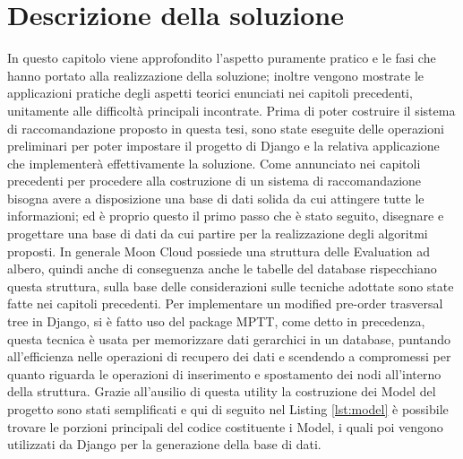 \chapter{Descrizione della soluzione}\label{chp:04-solution}
In questo capitolo viene approfondito l'aspetto puramente pratico e le fasi che hanno portato alla realizzazione della soluzione; 
inoltre vengono mostrate le applicazioni pratiche degli aspetti teorici enunciati nei capitoli precedenti, unitamente alle difficoltà 
principali incontrate.
\vspace{1.5 cm}
\hfill\break
Prima di poter costruire il sistema di raccomandazione proposto in questa tesi, sono state eseguite delle operazioni preliminari 
per poter impostare il progetto di Django e la relativa applicazione che implementerà effettivamente la soluzione.
%
Come annunciato nei capitoli precedenti per procedere alla costruzione di un sistema di raccomandazione bisogna avere a disposizione 
una base di dati solida da cui attingere tutte le informazioni; ed è proprio questo il primo passo che è stato seguito, disegnare 
e progettare una base di dati da cui partire per la realizzazione degli algoritmi proposti.
In generale Moon Cloud possiede una struttura delle Evaluation ad albero, quindi anche di conseguenza anche le tabelle del database 
rispecchiano questa struttura, sulla base delle considerazioni sulle tecniche adottate sono state fatte nei capitoli precedenti.\hfill\break
Per implementare un modified pre-order trasversal tree in Django, si è fatto uso del package MPTT, come detto in precedenza, questa 
tecnica è usata per memorizzare dati gerarchici in un database, puntando all'efficienza nelle operazioni di recupero dei dati e 
scendendo a compromessi per quanto riguarda le operazioni di inserimento e spostamento dei nodi all'interno della struttura.
Grazie all'ausilio di questa utility la costruzione dei Model del progetto sono stati semplificati e qui di seguito nel Listing \ref{lst:model} 
è possibile trovare le porzioni principali del codice costituente i Model, i quali poi vengono utilizzati da Django per la 
generazione della base di dati.
%
\lstset{style=python_code_style}
